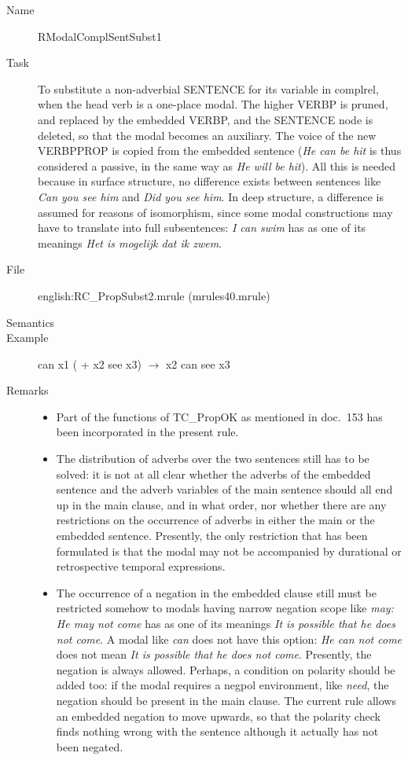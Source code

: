 \begin{description}
\vspace{1 cm}
\begin{description}
\item[Name]   RModalComplSentSubst1
\item[Task] To substitute a non-adverbial SENTENCE for its variable in 
complrel, when the head verb is a one-place modal. The higher VERBP is pruned, 
and replaced by the embedded VERBP, and the SENTENCE node is deleted, so that 
the modal becomes an auxiliary. The voice of the new VERBPPROP is copied from 
the embedded sentence ({\em He can be hit\/} is thus considered a passive, in 
the same way as {\em He will be hit\/}). All 
this is needed because in surface structure, no difference exists between 
sentences like {\em Can you see him\/} and {\em Did you see him\/}. In deep 
structure, a difference is assumed for reasons of isomorphism, since some modal 
constructions may have to translate into full subsentences: {\em I can swim\/} 
has as one of its meanings {\em Het is mogelijk dat ik zwem\/}.
\item[File] english:RC\_PropSubst2.mrule (mrules40.mrule)
\item[Semantics]
\item[Example] can x1 ( + x2 see x3) $\rightarrow$ x2 can see x3
\item[Remarks] \mbox{}
\begin{itemize}
\item Part of the functions of TC\_PropOK as mentioned in doc.\ 153 has been 
incorporated in the present rule.
\item The distribution of adverbs over the two sentences still has to 
be solved: it is not at all clear whether the adverbs of the embedded sentence 
and the adverb variables of the main sentence
should all end up in the main clause, and in what order, nor whether there are 
any restrictions on the occurrence of adverbs in either the main or the 
embedded sentence. Presently, the only restriction that has been formulated is 
that the modal may not be accompanied by durational or retrospective temporal 
expressions.
\item The occurrence of a negation in the embedded clause still must be 
restricted somehow to modals having narrow negation scope like {\em may: He may 
not come\/} has as one of its meanings {\em It is possible that he does not 
come\/}. A modal like {\em can\/} does not have this option: {\em He can not 
come\/} does not mean {\em It is possible that he does not come\/}. Presently, 
the negation is always allowed. Perhaps, a condition on polarity should be 
added too: if the modal requires a negpol environment, like {\em need\/}, 
the negation should be present in the main clause. The current rule allows an 
embedded negation to move upwards, so that the polarity check finds nothing 
wrong with the sentence although it actually has not been negated.
\end{itemize}
\end{description}


\end{description}
